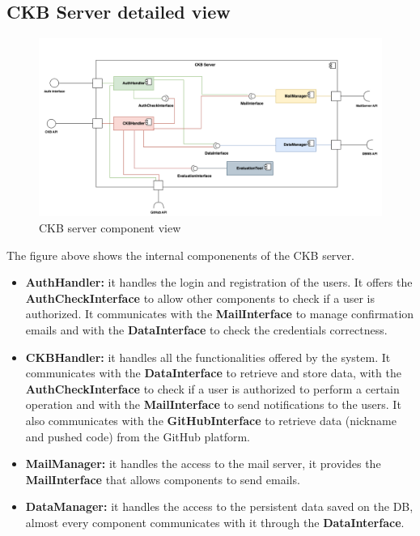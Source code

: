 \subsection{CKB Server detailed view}
\begin{figure}[H]
    \centering
    \includegraphics[width=\textwidth]{images/component_view/CKB_component.png}
    \caption{CKB server component view}
\end{figure}
The figure above shows the internal componenents of the CKB server.
\begin{itemize}
    \item \textbf{AuthHandler: } it handles the login and registration of the users. It offers the \textbf{AuthCheckInterface} to allow other components to check 
    if a user is authorized. It communicates with the \textbf{MailInterface} to manage confirmation emails and with the \textbf{DataInterface} to check the credentials
    correctness.
    \item \textbf{CKBHandler: } it handles all the functionalities offered by the system. It communicates with the \textbf{DataInterface} to retrieve and store data, with 
    the \textbf{AuthCheckInterface} to check if a user is authorized to perform a certain operation and with the \textbf{MailInterface} to send notifications to the users.
    It also communicates with the \textbf{GitHubInterface} to retrieve data (nickname and pushed code) from the GitHub platform.
    \item \textbf{MailManager: } it handles the access to the mail server, it provides the \textbf{MailInterface} that allows components to send emails.
    \item \textbf{DataManager: } it handles the access to the persistent data saved on the DB, almost every component communicates with it through the \textbf{DataInterface}.
\end{itemize}



